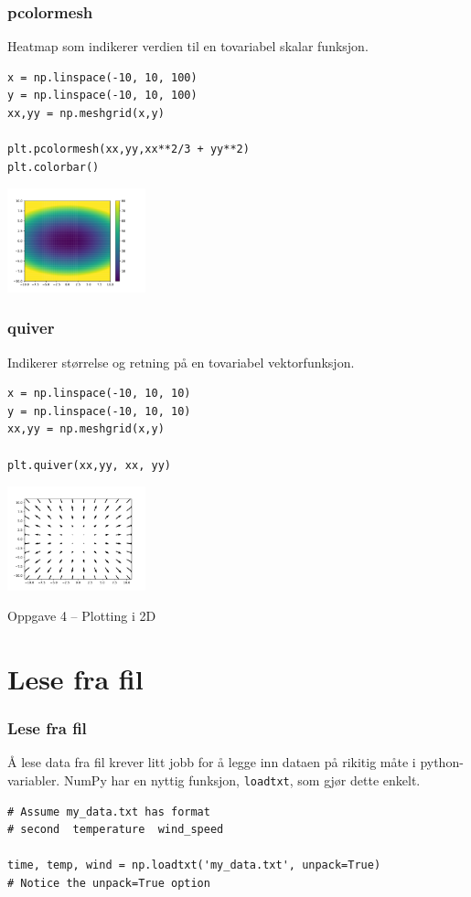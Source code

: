\documentclass{beamer}
\begin{document}
\begin{frame}[fragile]
  \frametitle{pcolormesh}
  Heatmap som indikerer verdien til en tovariabel skalar funksjon.
  \begin{lstlisting}
x = np.linspace(-10, 10, 100)
y = np.linspace(-10, 10, 100)
xx,yy = np.meshgrid(x,y)

plt.pcolormesh(xx,yy,xx**2/3 + yy**2)
plt.colorbar()
  \end{lstlisting}
    \includegraphics[width=0.3\textwidth]{colormap2}
\end{frame}
\begin{frame}[fragile]
  \frametitle{quiver}
  Indikerer størrelse og retning på en tovariabel vektorfunksjon.
  \begin{lstlisting}
x = np.linspace(-10, 10, 10)
y = np.linspace(-10, 10, 10)
xx,yy = np.meshgrid(x,y)

plt.quiver(xx,yy, xx, yy)
  \end{lstlisting}
      \includegraphics[width=0.3\textwidth]{quiver}
\end{frame}

\begin{frame}
  \begin{block}{Oppgave 4 -- Plotting i 2D}\end{block}
\end{frame}

\section{Lese fra fil}
\begin{frame}[fragile]
  \frametitle{Lese fra fil}

  Å lese data fra fil krever litt jobb for å legge inn dataen på rikitig måte i python-variabler.
  NumPy har en nyttig funksjon, \lstinline{loadtxt}, som gjør dette enkelt.
  \begin{lstlisting}
# Assume my_data.txt has format
# second  temperature  wind_speed

time, temp, wind = np.loadtxt('my_data.txt', unpack=True)
# Notice the unpack=True option
  \end{lstlisting}
\end{frame}
\end{document}
